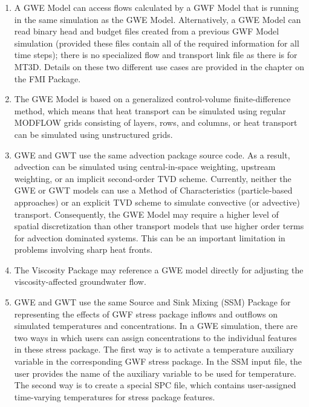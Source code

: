\begin{enumerate}

\item A GWE Model can access flows calculated by a GWF Model that is running in the same simulation as the GWE Model.  Alternatively, a GWE Model can read binary head and budget files created from a previous GWF Model simulation (provided these files contain all of the required information for all time steps); there is no specialized flow and transport link file \citep{zheng2001modflow} as there is for MT3D.  Details on these two different use cases are provided in the chapter on the FMI Package.

\item The GWE Model is based on a generalized control-volume finite-difference method, which means that heat transport can be simulated using regular MODFLOW grids consisting of layers, rows, and columns, or heat transport can be simulated using unstructured grids.

\item GWE and GWT use the same advection package source code.  As a result, advection can be simulated using central-in-space weighting, upstream weighting, or an implicit second-order TVD scheme.  Currently, neither the GWE or GWT models can use a Method of Characteristics (particle-based approaches) or an explicit TVD scheme to simulate convective (or advective) transport.  Consequently, the GWE Model may require a higher level of spatial discretization than other transport models that use higher order terms for advection dominated systems.  This can be an important limitation in problems involving sharp heat fronts. 

\item The Viscosity Package may reference a GWE model directly for adjusting the viscosity-affected groundwater flow.   

\item GWE and GWT use the same Source and Sink Mixing (SSM) Package for representing the effects of GWF stress package inflows and outflows on simulated temperatures and concentrations.  In a GWE simulation, there are two ways in which users can assign concentrations to the individual features in these stress package.  The first way is to activate a temperature auxiliary variable in the corresponding GWF stress package.  In the SSM input file, the user provides the name of the auxiliary variable to be used for temperature.  The second way is to create a special SPC file, which contains user-assigned time-varying temperatures for stress package features.


\end{enumerate}
